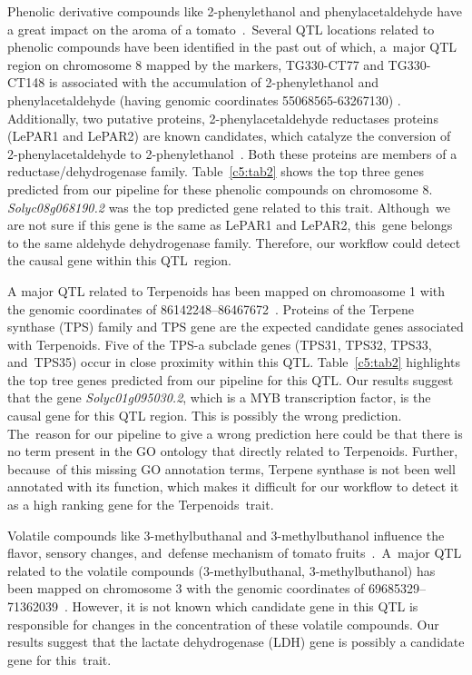 \documentclass[applsci,article,accept,moreauthors,pdftex]{Definitions/mdpi}
\begin{document}
{Phenolic derivative compounds like 2-phenylethanol and %
phenylacetaldehyde have a great impact on the aroma of a tomato~\cite{tadmor2002identification}.~Several QTL locations related to phenolic compounds have been identified in the past out of which, a~major QTL region on chromosome 8 mapped by the markers, TG330-CT77 and TG330-CT148 is associated with the accumulation of 2-phenylethanol and phenylacetaldehyde (having genomic coordinates 55068565-63267130) \cite{rousseaux2005qtl}. Additionally, two putative proteins, 2-phenylacetaldehyde reductases proteins (LePAR1 and LePAR2) are known candidates, which catalyze the conversion of 2-phenylacetaldehyde to 2-phenylethanol~\cite{tieman2007tomato}. Both these proteins are members of a reductase/dehydrogenase family.
Table~\ref{c5:tab2} shows %
the top three %
genes predicted from our pipeline for these phenolic compounds on chromosome 8. %
\textit{Solyc08g068190.2} was the top predicted gene related to this trait. Although~we are not sure if this gene is the same as LePAR1 and LePAR2, this~gene belongs to the same aldehyde dehydrogenase family.
Therefore, %
our workflow could detect the causal gene within this QTL~region. 

A major QTL related to Terpenoids has been mapped on chromoasome 1 with the genomic coordinates of 86142248--86467672~\cite{zhang2015genome}. Proteins of the Terpene synthase (TPS) family and TPS gene are the expected candidate genes associated with Terpenoids.
Five of the TPS-a subclade genes %
(TPS31, TPS32, TPS33, and~TPS35) occur in close proximity within this QTL.
Table~\ref{c5:tab2} highlights the top tree genes %
predicted from our pipeline for this QTL. Our results suggest that the gene \textit{Solyc01g095030.2}, which is a MYB transcription factor, is the causal gene for this QTL region. This is possibly the wrong prediction. The~reason for our pipeline to give a wrong prediction here could be that there is no term present in the GO ontology that directly related to Terpenoids. Further, because~of this missing GO annotation terms, Terpene synthase is not been well annotated with its function, which makes it difficult for our workflow to detect it as a high ranking gene for the Terpenoids~trait. 

Volatile compounds like 3-methylbuthanal and %
3-methylbuthanol influence the flavor, sensory changes, and~defense mechanism of tomato fruits~\cite{socaci2014chemometric}.~A~major QTL related to the volatile compounds (3-methylbuthanal, 3-methylbuthanol) has been mapped on chromosome 3 with the genomic coordinates of 69685329--71362039~\cite{rambla2016identification}. However, it is not known which candidate gene in this QTL is responsible for changes in the concentration of these volatile compounds. Our results suggest that the lactate dehydrogenase (LDH) gene is possibly a candidate gene for this~trait. 

}
\end{document}
